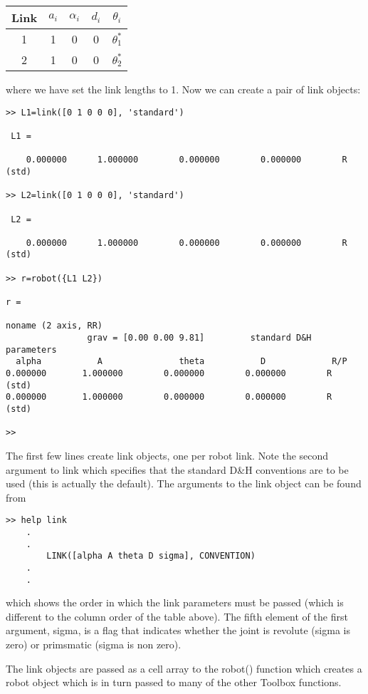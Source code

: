 \documentclass{article}
\newcommand{\var}[1]{{\vtt #1}}
\begin{document}
\begin{center}
\begin{tabular}{|c|c|c|c|c|} \hline
Link & $a_i$ & $\alpha_i$ & $d_i$ & $\theta_i$ \\ \hline
1 & 1 & 0 & 0 & $\theta_1^*$ \\
2 & 1 & 0 & 0 & $\theta_2^*$ \\ \hline
\end{tabular}
\end{center}

where we have set the link lengths to 1.  Now we can create a pair of
link objects:
\begin{verbatim}
>> L1=link([0 1 0 0 0], 'standard') 
 
 L1 = 
  
    0.000000      1.000000        0.000000        0.000000        R    (std)
     
>> L2=link([0 1 0 0 0], 'standard')
      
 L2 = 
       
    0.000000      1.000000        0.000000        0.000000        R    (std)

>> r=robot({L1 L2})                
 
r = 
 
noname (2 axis, RR)
                grav = [0.00 0.00 9.81]         standard D&H parameters
  alpha           A               theta           D             R/P
0.000000       1.000000        0.000000        0.000000        R    (std)
0.000000       1.000000        0.000000        0.000000        R    (std)

>>
\end{verbatim}
The first few lines create link objects, one per robot link.
Note the second argument to \var{link} which specifies that the standard
D\&H conventions are to be used (this is actually the default).
The arguments to the link object can be found from
\begin{verbatim}
>> help link
    .
    .
        LINK([alpha A theta D sigma], CONVENTION)
    .
    .
\end{verbatim}
which shows the order in which the link parameters must be passed (which
is different to the column order of the table above).
The fifth element of the first argument, \var{sigma}, is a flag that 
indicates whether the
joint is revolute (\var{sigma} is zero) or primsmatic (\var{sigma} is non zero).

The link objects are passed as a cell array to the \var{robot()} function
which creates a robot object which is in turn passed to many of the 
other Toolbox functions.
\end{document}
